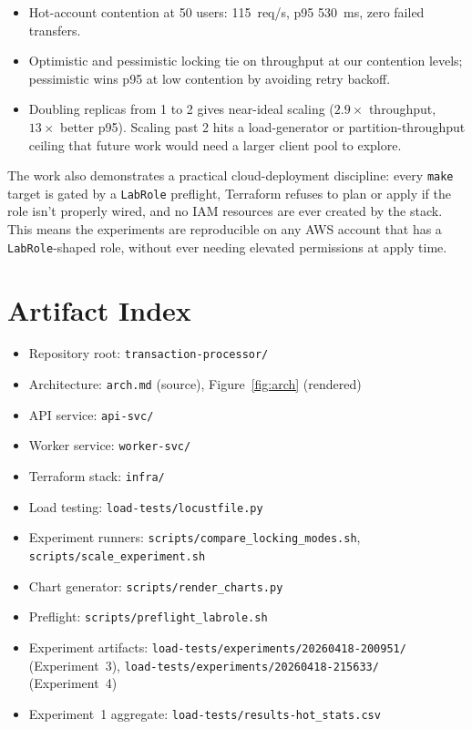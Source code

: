 \documentclass[11pt,a4paper]{article}
\begin{document}
\begin{itemize}[leftmargin=*, itemsep=0.2em]
    \item Hot-account contention at 50 users: 115~req/s, p95 530~ms, zero failed transfers.
    \item Optimistic and pessimistic locking tie on throughput at our contention levels; pessimistic wins p95 at low contention by avoiding retry backoff.
    \item Doubling replicas from 1 to 2 gives near-ideal scaling ($2.9\times$ throughput, $13\times$ better p95). Scaling past 2 hits a load-generator or partition-throughput ceiling that future work would need a larger client pool to explore.
\end{itemize}

The work also demonstrates a practical cloud-deployment discipline: every \texttt{make} target is gated by a \texttt{LabRole} preflight, Terraform refuses to plan or apply if the role isn't properly wired, and no IAM resources are ever created by the stack. This means the experiments are reproducible on any AWS account that has a \texttt{LabRole}-shaped role, without ever needing elevated permissions at apply time.

\appendix
\section{Artifact Index}

\begin{itemize}[leftmargin=*, itemsep=0.2em]
    \item Repository root: \texttt{transaction-processor/}
    \item Architecture: \texttt{arch.md} (source), Figure~\ref{fig:arch} (rendered)
    \item API service: \texttt{api-svc/}
    \item Worker service: \texttt{worker-svc/}
    \item Terraform stack: \texttt{infra/}
    \item Load testing: \texttt{load-tests/locustfile.py}
    \item Experiment runners: \texttt{scripts/compare\_locking\_modes.sh}, \texttt{scripts/scale\_experiment.sh}
    \item Chart generator: \texttt{scripts/render\_charts.py}
    \item Preflight: \texttt{scripts/preflight\_labrole.sh}
    \item Experiment artifacts: \texttt{load-tests/experiments/20260418-200951/} (Experiment~3), \texttt{load-tests/experiments/20260418-215633/} (Experiment~4)
    \item Experiment~1 aggregate: \texttt{load-tests/results-hot\_stats.csv}
\end{itemize}
\end{document}

